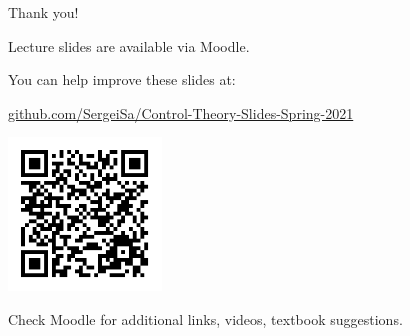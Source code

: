 \documentclass{beamer}
\begin{document}












\begin{frame}{Thank you!}
\centerline{Lecture slides are available via Moodle.}
\bigskip
\centerline{You can help improve these slides at:}
\centerline{\href{https://github.com/SergeiSa/Control-Theory-Slides-Spring-2021}{github.com/SergeiSa/Control-Theory-Slides-Spring-2021}}

\includegraphics[width=1.6in]{qrcode.png}\centerline{Check Moodle for additional links, videos, textbook suggestions.}
\bigskip

\end{frame}
\end{document}
